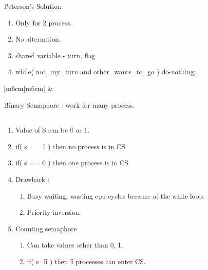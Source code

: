 \begin{enumerate}
  \item Peterson's Solution:
  \begin{enumerate}
    \item Only for 2 process.
    \item No alternation.
    \item shared variable - turn, flag
    \item while( not\_my\_turn and other\_wants\_to\_go ) do-nothing;
  \end{enumerate}
      \begin{myTableStyle}
        \begin{tabular}{ |m{6cm}|m{6cm}| } \hline
               &      \\ \hline
        \end{tabular}
      \end{myTableStyle}
      \vspace{0.08in}

 \begin{minipage}{\linewidth}
  \item Binary Semaphore : work for many process. \\
      \begin{myTableStyle}
        \begin{tabular}{ |m{4.5cm}|m{5cm}|m{3.5cm}| } \hline
               &
             &
             \\ \hline
        \end{tabular}
      \end{myTableStyle}
      \vspace{0.08in}
  \begin{enumerate}
    \item Value of S can be 0 or 1.
    \item if( s == 1 ) then no   process is in CS
    \item if( s == 0 ) then one process is in CS
    \item Drawback :
    \begin{enumerate}
      \item Busy waiting, wasting cpu cycles because of the while loop.
      \item Priority inversion.
  \end{enumerate}
  \item Counting semaphore
  \begin{enumerate}
    \item Can take values other than 0, 1.
    \item if( s=5 ) then 5 processes can enter CS.
  \end{enumerate}
  \end{enumerate}
  \end{minipage}
  \vspace{0.08in}


\end{enumerate}
